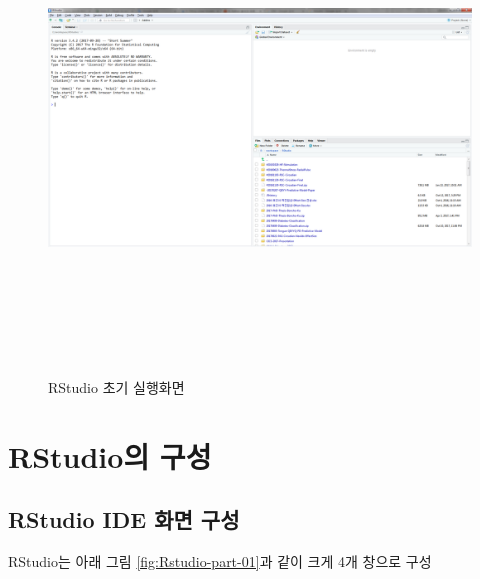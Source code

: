 \documentclass[12pt,a4paper]{book}
\theoremstyle{definition}
\theoremstyle{definition}
\theoremstyle{definition}
\theoremstyle{remark}
\begin{document}
\begin{figure}[H]
{
  \centering
  \includegraphics[width = 15cm, height = 13cm]{Figures/Rstudio-init.png}
  \caption[RStudio 초기 실행화면]{RStudio 초기 실행화면}\label{fig:Rstudio-install-05}
}
\end{figure}

\section{RStudio의 구성}\label{rstudio-}

\subsection{RStudio IDE 화면 구성}\label{rstudio-ide--}

RStudio는 아래 그림 \ref{fig:Rstudio-part-01}과 같이 크게 4개 창으로
구성
\end{document}

